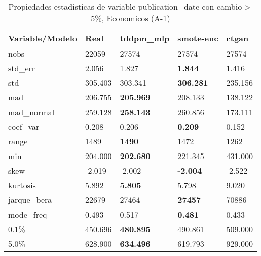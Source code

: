 \begin{table}[H]
\centering
\fontsize{8}{14}\selectfont
\caption{Propiedades estadisticas de variable publication\_date con cambio\ensuremath{>}5\%, Economicos (A-1)}
\label{table-stats-economicos-a-1-publication_date-short}
\begin{tabular}{|l|m{10em}|m{10em}|m{10em}|m{10em}|}
\hline
 \rowcolor[gray]{0.8}
Variable/Modelo & Real & tddpm\_mlp & smote-enc & ctgan \\
\hline nobs & 22059 & 27574 & 27574 & 27574 \\
\hline std\_err & 2.056 & 1.827 & \bfseries 1.844 & \cellcolor[rgb]{0.9, 0.54, 0.52} 1.416 \\
\hline std & 305.403 & 303.341 & \bfseries 306.281 & \cellcolor[rgb]{0.9, 0.54, 0.52} 235.156 \\
\hline mad & 206.755 & \bfseries 205.969 & 208.133 & \cellcolor[rgb]{0.9, 0.54, 0.52} 138.122 \\
\hline mad\_normal & 259.128 & \bfseries 258.143 & 260.856 & \cellcolor[rgb]{0.9, 0.54, 0.52} 173.111 \\
\hline coef\_var & 0.208 & 0.206 & \bfseries 0.209 & \cellcolor[rgb]{0.9, 0.54, 0.52} 0.152 \\
\hline range & 1489 & \bfseries 1490 & 1472 & \cellcolor[rgb]{0.9, 0.54, 0.52} 1262 \\
\hline min & 204.000 & \bfseries 202.680 & 221.345 & \cellcolor[rgb]{0.9, 0.54, 0.52} 431.000 \\
\hline skew & -2.019 & -2.002 & \bfseries -2.004 & \cellcolor[rgb]{0.9, 0.54, 0.52} -2.522 \\
\hline kurtosis & 5.892 & \bfseries 5.805 & 5.798 & \cellcolor[rgb]{0.9, 0.54, 0.52} 9.020 \\
\hline jarque\_bera & 22679 & 27464 & \bfseries 27457 & \cellcolor[rgb]{0.9, 0.54, 0.52} 70886 \\
\hline mode\_freq & 0.493 & 0.517 & \bfseries 0.481 & \cellcolor[rgb]{0.9, 0.54, 0.52} 0.433 \\
\hline 0.1\% & 450.696 & \bfseries 480.895 & 490.861 & \cellcolor[rgb]{0.9, 0.54, 0.52} 509.000 \\
\hline 5.0\% & 628.900 & \bfseries 634.496 & 619.793 & \cellcolor[rgb]{0.9, 0.54, 0.52} 929.000 \\
\hline
\end{tabular}
\end{table}

